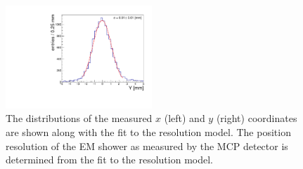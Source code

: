 \documentclass[12pt]{article}
\begin{document}
{\begin{figure}[htbp]
  \includegraphics[width=0.49\textwidth]{Images/XYResolution/Y_Resolution_fixedTrigger.pdf}
  \caption{ The distributions of the measured $x$ (left) and $y$ (right) coordinates are shown 
    along with the fit to the resolution model. The position resolution of the EM shower
    as measured by the MCP detector is determined from the fit to the resolution 
    model.  }
  \label{fig:ResolutionMeasurement}
\end{figure}
}
\end{document}
